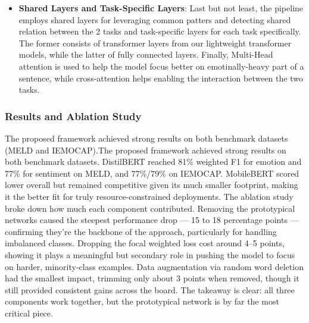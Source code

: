 \documentclass[a4paper,12pt]{article}
\begin{document}
\begin{itemize}
    \item{\textbf{Shared Layers and Task-Specific Layers}}: Last but not least, the pipeline employs shared layers for leveraging common patters and detecting shared relation between the 2 tasks and task-specific layers for each task specifically. The former consists of transformer layers from our lightweight transformer models, while the latter of fully connected layers. Finally, Multi-Head attention is used to help the model focus better on emotinally-heavy part of a sentence, while cross-attention helps enabling
        the interaction between the two tasks.
\end{itemize}

\subsubsection{Results and Ablation Study}
The proposed framework achieved strong results on both benchmark datasets (MELD and IEMOCAP).The proposed framework achieved strong results on both benchmark datasets. DistilBERT reached 81\% weighted F1 for emotion and 77\% for sentiment on MELD, and 77\%/79\% on IEMOCAP. MobileBERT scored lower overall but remained competitive given its much smaller footprint, making it the better fit for truly resource-constrained deployments.
The ablation study broke down how much each component contributed. Removing the prototypical networks caused the steepest performance drop — 15 to 18 percentage points — confirming they're the backbone of the approach, particularly for handling imbalanced classes. Dropping the focal weighted loss cost around 4–5 points, showing it plays a meaningful but secondary role in pushing the model to focus on harder, minority-class examples. 
Data augmentation via random word deletion had the smallest impact, trimming only about 3 points when removed, though it still provided consistent gains across the board. The takeaway is clear: all three components work together, but the prototypical network is by far the most critical piece.

\clearpage


\end{document}
